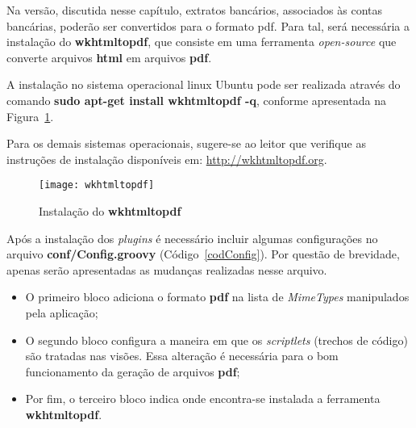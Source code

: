  Na versão,  discutida nesse capítulo,
extratos bancários, associados às contas bancárias, poderão ser convertidos para
o formato pdf.  Para tal, será necessária a instalação do {\bf wkhtmltopdf}, que
consiste em uma ferramenta {\it open-source} que converte arquivos {\bf html} em
arquivos {\bf pdf}. 

A instalação no  sistema operacional linux Ubuntu pode  ser realizada através do
comando  {\bf sudo  apt-get  install wkhtmltopdf  -q},  conforme apresentada  na
Figura~\ref{figWkhtmltopdf}.  

\vspace{0.5cm}

\begin{remark}
Para  os demais  sistemas operacionais,  sugere-se  ao leitor  que verifique  as
instruções           de           instalação           disponíveis           em:
{\footnotesize\url{http://wkhtmltopdf.org}}.  
\end{remark}

\begin{figure}[htbp]
\centering\texttt{[image: wkhtmltopdf]}
\caption{Instalação do {\bf wkhtmltopdf}}
\label{figWkhtmltopdf}
\end{figure}

\newpage

   Após  a  instalação dos  {\it
  plugins}  é   necessário  incluir   algumas  configurações  no   arquivo  {\bf
  conf/Config.groovy} (Código~\ref{codConfig}). Por questão de brevidade, apenas
serão apresentadas as mudanças realizadas nesse arquivo.  

\begin{itemize}

\vspace{0.3cm}

\item O primeiro bloco adiciona o  formato {\bf pdf} na lista de {\it MimeTypes}
  manipulados pela aplicação;

\vspace{0.3cm}

\item O segundo bloco configura a maneira em que os {\it scriptlets} (trechos de
  código)  são tratadas  nas  visões. Essa  alteração  é necessária  para o  bom
  funcionamento da geração de arquivos {\bf pdf};

\vspace{0.3cm}

\item Por fim,  o terceiro bloco indica onde  encontra-se instalada a ferramenta
  {\bf wkhtmltopdf}. 

\end{itemize}

